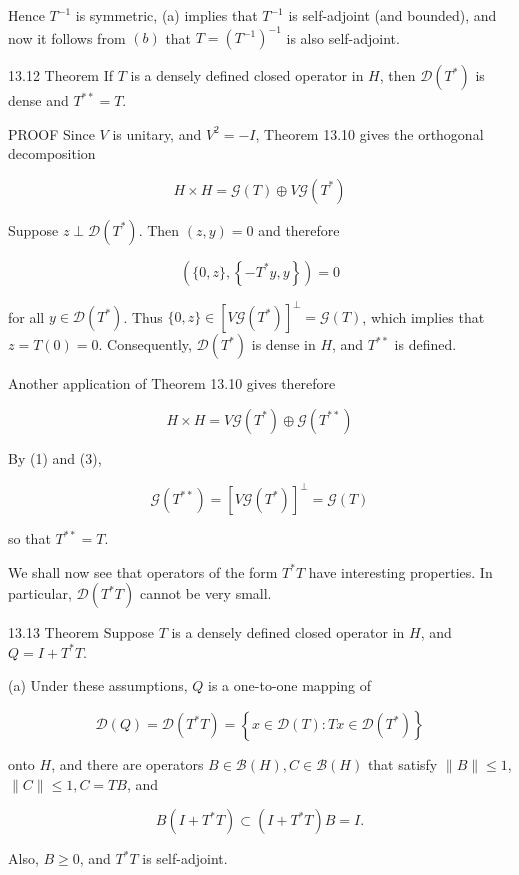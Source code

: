 \documentclass[10pt]{article}
\begin{document}
Hence $T^{-1}$ is symmetric, (a) implies that $T^{-1}$ is self-adjoint (and bounded), and now it follows from $(b)$ that $T=\left(T^{-1}\right)^{-1}$ is also self-adjoint.

13.12 Theorem If $T$ is a densely defined closed operator in $H$, then $\mathscr{D}\left(T^{*}\right)$ is dense and $T^{* *}=T$.

PROOF Since $V$ is unitary, and $V^{2}=-I$, Theorem 13.10 gives the orthogonal decomposition

$$
H \times H=\mathscr{G}(T) \oplus V \mathscr{G}\left(T^{*}\right)
$$

Suppose $z \perp \mathscr{D}\left(T^{*}\right)$. Then $(z, y)=0$ and therefore

$$
\left(\{0, z\},\left\{-T^{*} y, y\right\}\right)=0
$$

for all $y \in \mathscr{D}\left(T^{*}\right)$. Thus $\{0, z\} \in\left[V \mathscr{G}\left(T^{*}\right)\right]^{\perp}=\mathscr{G}(T)$, which implies that $z=T(0)=0$. Consequently, $\mathscr{D}\left(T^{*}\right)$ is dense in $H$, and $T^{* *}$ is defined.

Another application of Theorem 13.10 gives therefore

$$
H \times H=V \mathscr{G}\left(T^{*}\right) \oplus \mathscr{G}\left(T^{* *}\right)
$$

By (1) and (3),

$$
\mathscr{G}\left(T^{* *}\right)=\left[V \mathscr{G}\left(T^{*}\right)\right]^{\perp}=\mathscr{G}(T)
$$

so that $T^{* *}=T$.

We shall now see that operators of the form $T^{*} T$ have interesting properties. In particular, $\mathscr{D}\left(T^{*} T\right)$ cannot be very small.

13.13 Theorem Suppose $T$ is a densely defined closed operator in $H$, and $Q=I+T^{*} T$.

(a) Under these assumptions, $Q$ is a one-to-one mapping of

$$
\mathscr{D}(Q)=\mathscr{D}\left(T^{*} T\right)=\left\{x \in \mathscr{D}(T): T x \in \mathscr{D}\left(T^{*}\right)\right\}
$$

onto $H$, and there are operators $B \in \mathscr{B}(H), C \in \mathscr{B}(H)$ that satisfy $\|B\| \leq 1$, $\|C\| \leq 1, C=T B$, and

$$
B\left(I+T^{*} T\right) \subset\left(I+T^{*} T\right) B=I .
$$

Also, $B \geq 0$, and $T^{*} T$ is self-adjoint.
\end{document}
